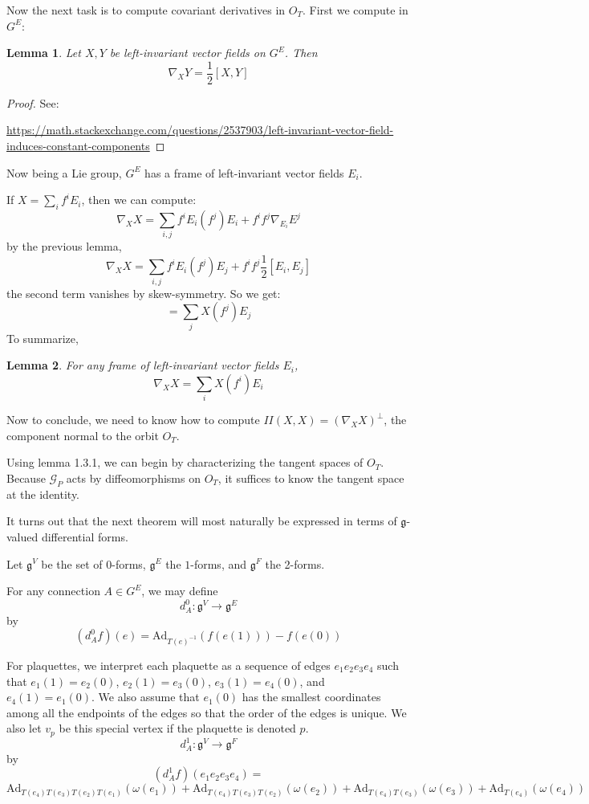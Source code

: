 \documentclass[11pt]{amsart}
\numberwithin{theorem}{subsection}
\newtheorem{lemma}{Lemma}
\numberwithin{lemma}{subsection}
\numberwithin{corollary}{subsection}
\numberwithin{definition}{subsection}
\numberwithin{prop}{subsection}
\begin{document}
Now the next task is to compute covariant derivatives in $O_T$. First we compute in $G^E$:
\begin{lemma}
Let $X,Y$ be left-invariant  vector fields on $G^E$. Then 
\[\nabla_X Y = \frac{1}{2}[X,Y]\]
\end{lemma}
\begin{proof}
  See:

  \url{https://math.stackexchange.com/questions/2537903/left-invariant-vector-field-induces-constant-components}
\end{proof}

Now being a Lie group, $G^E$ has a frame of left-invariant vector fields $E_i$.

If $X=\sum_i f^i E_i$, then we can compute:
\[\nabla_X X = \sum_{i,j} f^iE_i(f^j)E_i +f^i f^j\nabla_{E_i} E^j\]
by the previous lemma, 
\[\nabla_X X = \sum_{i,j} f^i E_i(f^j)E_j +f^i f^j\frac{1}{2}[E_i,E_j]\]
the second term vanishes by skew-symmetry. So we get:
\[= \sum_j X(f^j)E_j \]
To summarize,
\begin{lemma}
  For any frame of left-invariant vector fields $E_i$,
\[\nabla_X X = \sum_i X(f^i)E_i\]
\end{lemma}

Now to conclude, we need to know how to compute $II(X,X)=(\nabla_X X)^\perp$,
the component normal to the orbit $O_T$.

Using lemma 1.3.1, we can begin by characterizing the tangent spaces of $O_T$.
Because $\mathcal{G}_P$ acts by diffeomorphisms on $O_T$, it suffices to know the tangent space at the identity.

It turns out that the next theorem will most naturally be expressed in terms of $\mathfrak{g}$-valued differential forms.

Let $\mathfrak{g}^V$ be the set of $0$-forms, $\mathfrak{g}^E$ the $1$-forms, and $\mathfrak{g}^F$ the 2-forms.

For any connection $A\in G^E$, we may define 
\[d^0_A:\mathfrak{g}^V\to \mathfrak{g}^E\]
by 
\[(d_A^0f)(e)= \text{Ad}_{T(e)^{-1}}(f(e(1)))-f(e(0))\]

For plaquettes, we interpret each plaquette as a sequence of edges $e_1e_2e_3e_4$
such that $e_1(1)=e_2(0)$, $e_2(1)=e_3(0)$, $e_3(1)=e_4(0)$, and $e_4(1)=e_1(0)$.
We also assume that $e_1(0)$ has the smallest coordinates among all the endpoints of the edges
so that the order of the edges is unique. We also let $v_p$ be this special vertex if the plaquette is denoted $p$.
\[d^1_A:\mathfrak{g}^V\to \mathfrak{g}^F\]
by 
\[(d^1_A f)(e_1e_2e_3e_4) =\]\[ \text{Ad}_{T(e_4)T(e_3)T(e_2)T(e_1)}(\omega(e_1)) + \text{Ad}_{T(e_4)T(e_3)T(e_2)}(\omega(e_2)) + \text{Ad}_{T(e_4)T(e_3)}(\omega(e_3)) + \text{Ad}_{T(e_4)}(\omega(e_4))\]
\end{document}
